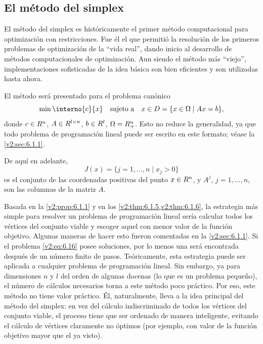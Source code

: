 
\subsection{El método del simplex}
\label{v2:sec:6.1.2}

El método del simplex es históricamente el primer método computacional para optimización con restricciones. Fue él el que permitió la resolución de los primeros problemas de optimización de la ``vida real'', dando inicio al desarrollo de métodos computacionales de optimización. Aun siendo el método más ``viejo'', implementaciones sofisticadas de la idea básica son bien eficientes y son utilizadas hasta ahora.

El método será presentado para el problema canónico
\begin{equation}
    \min \interno{c}{x} \quad \text{sujeto a} \quad x \in D = \{ x \in \Omega \mid Ax = b \},
    \label{v2:eq:6.16}
\end{equation}
donde $c \in R^n$, $A \in R^{l \times n}$, $b \in R^l$, $\Omega = R^n_+$. Esto no reduce la generalidad, ya que todo problema de programación lineal puede ser escrito en este formato; véase la \cref{v2:sec:6.1.1}.

De aquí en adelante,
\[
    J(x) = \{ j = 1, \dots, n \mid x_j > 0 \}
\]
es el conjunto de las coordenadas positivas del punto $x \in R^n$, y $A^j$, $j = 1, \dots, n$, son las columnas de la matriz $A$.

Basada en la \cref{v2:prop:6.1.1} y en los \cref{v2:thm:6.1.5,v2:thm:6.1.6}, la estrategia más simple para resolver un problema de programación lineal sería calcular todos los vértices del conjunto viable y escoger aquel con menor valor de la función objetivo. Algunas maneras de hacer esto fueron comentadas en la \cref{v2:sec:6.1.1}. Si el problema \eqref{v2:eq:6.16} posee soluciones, por lo menos una será encontrada después de un número finito de pasos. Teóricamente, esta estrategia puede ser aplicada a cualquier problema de programación lineal. Sin embargo, ya para dimensiones $n$ y $l$ del orden de algunas docenas (lo que es un problema pequeño), el número de cálculos necesarios torna a este método poco práctico. Por eso, este método no tiene valor práctico. Él, naturalmente, lleva a la idea principal del método del simplex: en vez del cálculo indiscriminado de todos los vértices del conjunto viable, el proceso tiene que ser ordenado de manera inteligente, evitando el cálculo de vértices claramente no óptimos (por ejemplo, con valor de la función objetivo mayor que el ya visto).

